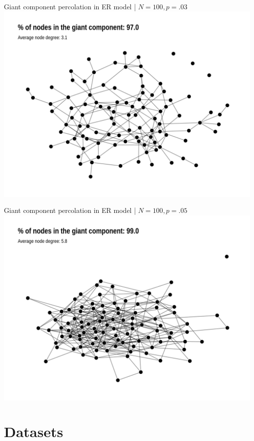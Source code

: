 \documentclass[
    hyperref={colorlinks,linkcolor=blue,urlcolor=blue,citecolor=blue}
]{beamer}
\begin{document}
\begin{frame}{Giant component percolation in ER model | $N = 100, p = .03$}
\centering
\includegraphics[width=.9\textwidth]{overview/er_model_percolation-5.png}
\end{frame}

\begin{frame}{Giant component percolation in ER model | $N = 100, p = .05$}
\centering
\includegraphics[width=.9\textwidth]{overview/er_model_percolation-6.png}
\end{frame}

\section{Datasets}
\end{document}
